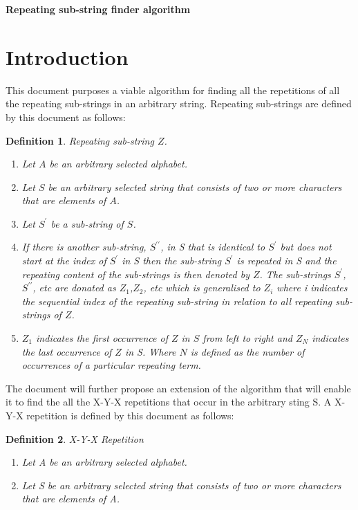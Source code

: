 \documentclass[12pt]{article}
\newtheorem{defn}{Definition}[section]
\begin{document}
\begin{center}
	\LARGE\textbf{Repeating sub-string finder algorithm}
\end{center}

\newpage
\tableofcontents
\newpage
\section{Introduction}
\begin{flushleft}
	This document purposes a viable algorithm for finding all the repetitions of all the repeating sub-strings in an arbitrary string. Repeating sub-strings are defined by this document as follows:\\
	\begin{defn}
	    Repeating sub-string $Z$.   
		\begin{enumerate}
			\item Let $A$ be an arbitrary selected alphabet.
			\item Let $S$ be an arbitrary selected string that consists of two or more characters that are elements of $A$.
			\item Let  $S^{\prime}$ be a sub-string of $S$.
			\item If there is another sub-string,  $S^{\prime\prime}$, in S that is identical to  $S^{\prime}$ but does not start at the index of  $S^{\prime}$ in S then the sub-string  $S^{\prime}$ is repeated in S and the repeating content of the sub-strings is then denoted by $Z$. The sub-strings $S^{\prime}$, $S^{\prime\prime}$, etc are donated as $Z_{1}$,$Z_{2}$, etc which is generalised to $Z_{i}$ where i indicates the sequential index of the repeating sub-string in relation to all repeating sub-strings of $Z$.
			\item $Z_{1}$ indicates the first occurrence of $Z$ in $S$ from left to right and $Z_{N}$ indicates the last occurrence of $Z$ in S. Where $N$ is defined as the number of occurrences of a particular repeating term.  
		\end{enumerate}
	\end{defn}
	The document will further propose an extension of the algorithm that will enable it to find the all the X-Y-X repetitions that occur in the arbitrary sting S. A X-Y-X repetition is defined by this document as follows:   
	\begin{defn} X-Y-X Repetition
		\begin{enumerate}
			\item Let A be an arbitrary selected alphabet.
			\item Let S be an arbitrary selected string that consists of two or more characters that are elements of A. 

\end{enumerate}
\end{defn}
\end{flushleft}
\end{document}
